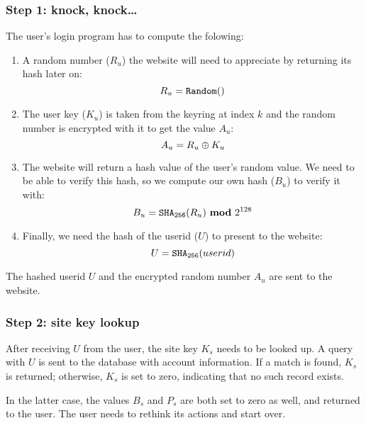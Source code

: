 \subsubsection{Step 1: knock, knock\ldots}
\label{sec:login_step1}
The user's login program has to compute the folowing:
\begin{enumerate}
\item A random number ($R_u$) the website will need to appreciate by returning its hash later on:
\[R_u=\texttt{Random}()\]
\item The user key ($K_u$) is taken from the keyring at index $k$ and the random number is encrypted with it to get the value $A_u$:
\[A_u=R_u\oplus K_u\]
\item The website will return a hash value of the user's random value.
We need to be able to verify this hash, so we compute our own hash ($B_u$) to verify it with:
\[B_u=\texttt{\ensuremath{\mathtt{SHA_{256}}}}(R_u)\ \textbf{mod}\ 2^{128}\]
\item Finally, we need the hash of the userid ($U$) to present to the website:
\[U=\texttt{\ensuremath{\mathtt{SHA_{256}}}}(userid)\]
\end{enumerate}
The hashed userid $U$ and the encrypted random number $A_u$ are sent to the website.

\subsubsection{Step 2: site key lookup}
\label{sec:login_step2}
After receiving $U$ from the user, the site key $K_s$ needs to be looked up.
A query with $U$ is sent to the database with account information.
If a match is found, $K_s$ is returned;
otherwise, $K_s$ is set to zero, indicating that no such record exists.
\par
In the latter case, the values $B_s$ and $P_s$ are both set to zero as well, and returned to the user.
The user needs to rethink its actions and start over.


